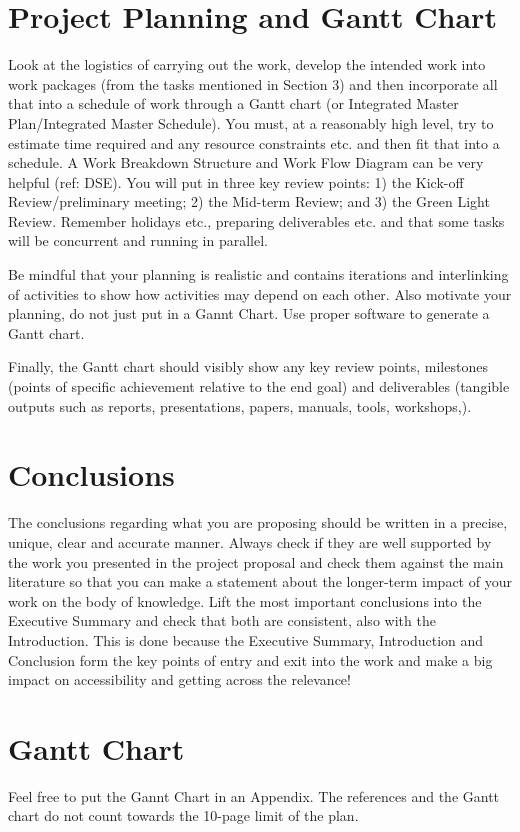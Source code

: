 \documentclass[12pt, english, NoHyper]{AE4010-template}
\begin{document}
\section{Project Planning and Gantt Chart}
Look at the logistics of carrying out the work, develop the intended work into work packages (from the tasks mentioned in Section 3) and then incorporate all that into a schedule of work through a Gantt chart (or Integrated Master Plan/Integrated Master Schedule). You must, at a reasonably high level, try to estimate time required and any resource constraints etc. and then fit that into a schedule. A Work Breakdown Structure and Work Flow Diagram can be very helpful (ref: DSE). You will put in three key review points: 1) the Kick-off Review/preliminary meeting; 2) the Mid-term Review; and 3) the Green Light Review. Remember holidays etc., preparing deliverables etc. and that some tasks will be concurrent and running in parallel. 

Be mindful that your planning is realistic and contains iterations and interlinking of activities to show how activities may depend on each other. Also motivate your planning, do not just put in a Gannt Chart. Use proper software to generate a Gantt chart.

\noindent Finally, the Gantt chart should visibly show any key review points, milestones (points of specific achievement relative to the end goal) and deliverables (tangible outputs such as reports, presentations, papers, manuals, tools, workshops,).






\section{Conclusions}
The conclusions regarding what you are proposing should be written in a precise, unique, clear and accurate manner. Always check if they are well supported by the work you presented in the project proposal and check them against the main literature so that you can make a statement about the longer-term impact of your work on the body of knowledge. Lift the most important conclusions into the Executive Summary and check that both are consistent, also with the Introduction. This is done because the Executive Summary, Introduction and Conclusion form the key points of entry and exit into the work and make a big impact on accessibility and getting across the relevance!


\appendix




\section{Gantt Chart}
Feel free to put the Gannt Chart in an Appendix. The references and the Gantt chart do not count towards the 10-page limit of the plan.
\end{document}
